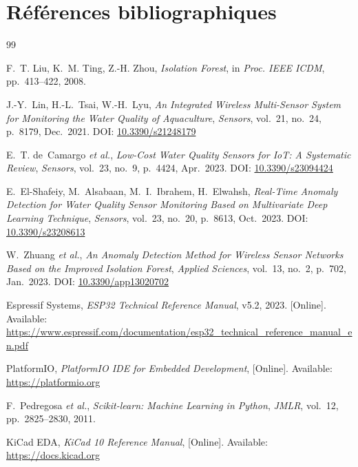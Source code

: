 \documentclass[12pt,a4paper]{report}
\begin{document}
\clearpage
\chapter*{Références bibliographiques}

\begin{thebibliography}{99}

F.~T. Liu, K.~M. Ting, Z.-H. Zhou,
\textit{Isolation Forest},
in \textit{Proc. IEEE ICDM}, pp.~413--422, 2008.

J.-Y.~Lin, H.-L.~Tsai, W.-H.~Lyu,
\textit{An Integrated Wireless Multi-Sensor System for Monitoring the Water Quality of Aquaculture},
\textit{Sensors}, vol.~21, no.~24, p.~8179, Dec.~2021.
DOI: \href{https://doi.org/10.3390/s21248179}{10.3390/s21248179}

E.~T. de~Camargo \textit{et al.},
\textit{Low-Cost Water Quality Sensors for IoT: A Systematic Review},
\textit{Sensors}, vol.~23, no.~9, p.~4424, Apr.~2023.
DOI: \href{https://doi.org/10.3390/s23094424}{10.3390/s23094424}

E.~El-Shafeiy, M.~Alsabaan, M.~I.~Ibrahem, H.~Elwahsh,
\textit{Real-Time Anomaly Detection for Water Quality Sensor Monitoring Based on Multivariate Deep Learning Technique},
\textit{Sensors}, vol.~23, no.~20, p.~8613, Oct.~2023.
DOI: \href{https://doi.org/10.3390/s23208613}{10.3390/s23208613}

W.~Zhuang \textit{et al.},
\textit{An Anomaly Detection Method for Wireless Sensor Networks Based on the Improved Isolation Forest},
\textit{Applied Sciences}, vol.~13, no.~2, p.~702, Jan.~2023.
DOI: \href{https://doi.org/10.3390/app13020702}{10.3390/app13020702}

Espressif Systems,
\textit{ESP32 Technical Reference Manual},
v5.2, 2023.
[Online]. Available: \url{https://www.espressif.com/documentation/esp32_technical_reference_manual_en.pdf}

PlatformIO,
\textit{PlatformIO IDE for Embedded Development},
[Online]. Available: \url{https://platformio.org}

F.~Pedregosa \textit{et al.},
\textit{Scikit-learn: Machine Learning in Python},
\textit{JMLR}, vol.~12, pp.~2825--2830, 2011.

KiCad EDA,
\textit{KiCad 10 Reference Manual},
[Online]. Available: \url{https://docs.kicad.org}


\end{thebibliography}
\end{document}
